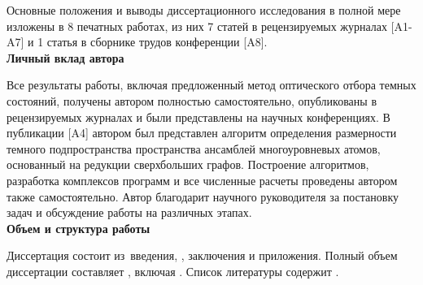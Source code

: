 Основные положения и выводы диссертационного исследования в полной мере изложены в 8 печатных работах, из них 7 статей в рецензируемых журна­лах [A1-A7] и 1 статья в сборнике трудов конференции [A8].
\
\\[18pt]
\indent\textbf{Личный вклад автора}

Все результаты работы, включая предложенный метод оптического отбора темных состояний, получены автором полностью самостоятельно, опубликова­ны в рецензируемых журналах и были представлены на научных конференциях. В публикации [A4] автором был представлен алгоритм определения размерно­сти темного подпространства пространства ансамблей многоуровневых атомов, основанный на редукции сверхбольших графов. Построение алгоритмов, разработка ком­плексов программ и все численные расчеты проведены автором также само­стоятельно. Автор благодарит научного руководителя за постановку задач и обсуждение работы на различных этапах.
\
\\[18pt]
\indent\textbf{Объем и структура работы}

Диссертация состоит из~введения,
, заключения и приложения.
%
Полный объем диссертации составляет
, включая
.
Список литературы содержит .


